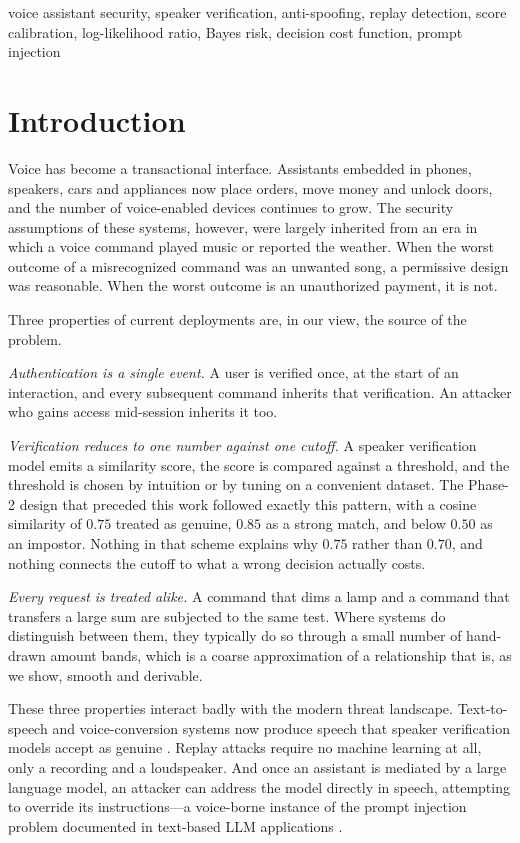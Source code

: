 \documentclass[conference]{IEEEtran}
\begin{document}
\begin{IEEEkeywords}
voice assistant security, speaker verification, anti-spoofing, replay
detection, score calibration, log-likelihood ratio, Bayes risk, decision cost
function, prompt injection
\end{IEEEkeywords}

\section{Introduction}

Voice has become a transactional interface. Assistants embedded in phones,
speakers, cars and appliances now place orders, move money and unlock doors,
and the number of voice-enabled devices continues to grow. The security
assumptions of these systems, however, were largely inherited from an era in
which a voice command played music or reported the weather. When the worst
outcome of a misrecognized command was an unwanted song, a permissive design
was reasonable. When the worst outcome is an unauthorized payment, it is not.

Three properties of current deployments are, in our view, the source of the
problem.

\emph{Authentication is a single event.} A user is verified once, at the start
of an interaction, and every subsequent command inherits that verification.
An attacker who gains access mid-session inherits it too.

\emph{Verification reduces to one number against one cutoff.} A speaker
verification model emits a similarity score, the score is compared against a
threshold, and the threshold is chosen by intuition or by tuning on a
convenient dataset. The Phase-2 design that preceded this work followed
exactly this pattern, with a cosine similarity of $0.75$ treated as genuine,
$0.85$ as a strong match, and below $0.50$ as an impostor. Nothing in that
scheme explains why $0.75$ rather than $0.70$, and nothing connects the cutoff
to what a wrong decision actually costs.

\emph{Every request is treated alike.} A command that dims a lamp and a command
that transfers a large sum are subjected to the same test. Where systems do
distinguish between them, they typically do so through a small number of
hand-drawn amount bands, which is a coarse approximation of a relationship that
is, as we show, smooth and derivable.

These three properties interact badly with the modern threat landscape.
Text-to-speech and voice-conversion systems now produce speech that speaker
verification models accept as genuine \cite{wu2015spoofing,todisco2019asvspoof}.
Replay attacks require no machine learning at all, only a recording and a
loudspeaker. And once an assistant is mediated by a large language model, an
attacker can address the model directly in speech, attempting to override its
instructions---a voice-borne instance of the prompt injection problem
documented in text-based LLM applications \cite{greshake2023injection}.
\end{document}
